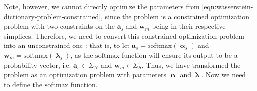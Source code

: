 Note, however, we cannot directly optimize the parameters from \cref{eqn:wasserstein-dictionary-problem-constrained},
since the problem is a constrained optimization problem with two constraints on the $\mathbf{a}_s$ and $\mathbf{w}_m$
being in their respective simplices.
Therefore, we need to convert this constrained optimization problem into an unconstrained one \citep{schmitz2018,xu2018}:
that is, to let $\mathbf{a}_s = \text{softmax} \left(\boldsymbol\upalpha_s\right)$
and $\mathbf{w}_m = \text{softmax}\left(\boldsymbol\uplambda_s\right)$,
as the $\text{softmax}$ function will ensure its output to be a probability vector,
i.e. $\mathbf{a}_s \in \Sigma_N$ and $\mathbf{w}_m \in \Sigma_S$.
Thus, we have transformed the problem as an optimization problem with parameters
$\boldsymbol\upalpha$ and $\boldsymbol\uplambda$.
Now we need to define the $\text{softmax}$ function.

